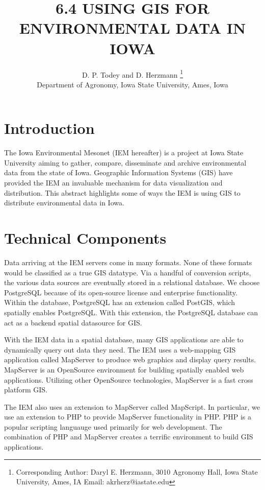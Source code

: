 \documentclass[twocolumn]{article}
\begin{document}
\title{\bf 6.4      USING GIS FOR ENVIRONMENTAL DATA IN IOWA}
\author{D. P. Todey and D. Herzmann \thanks{Corresponding Author:  Daryl E. Herzmann, 3010
Agronomy Hall, Iowa State University, Ames, IA Email: akrherz@iastate.edu}\\
 Department of Agronomy, Iowa State University, Ames, Iowa \\
}

\amstitle

\section{Introduction}

The Iowa Environmental Mesonet (IEM hereafter) is a project at Iowa State 
University aiming to gather, compare, disseminate and archive environmental 
data from the state of Iowa.  Geographic Information Systems (GIS) have
provided the IEM an invaluable mechanism for data visualization 
and distribution.  This abstract highlights some of ways the IEM is using
GIS to distribute environmental data in Iowa.

\section{Technical Components}

Data arriving at the IEM servers come in many formats.  None of these formats
 would be classified as a true GIS datatype.  Via a handful of conversion
scripts, the various data sources are eventually stored in a relational 
database.  We choose PostgreSQL because of its open-source 
license and enterprise functionality.  Within the database, PostgreSQL has 
an extension called PostGIS, which spatially enables PostgreSQL.  With this 
extension, the PostgreSQL database can act as a backend spatial datasource for
GIS.

With the IEM data in a spatial database, many GIS applications are able to 
dynamically query out data they need.  The IEM uses a web-mapping GIS 
application called MapServer to produce web graphics and display query results.
MapServer is an OpenSource environment for building spatially enabled web
applications.  Utilizing other OpenSource technologies, MapServer is a fast 
cross platform GIS.

The IEM also uses an extension to MapServer called MapScript.  In particular, 
we use an extension to PHP to provide MapServer functionality in PHP.  PHP
is a popular scripting languauge used primarily for web development.  The 
combination of PHP and MapServer creates a terrific environment to build GIS
applications.
\end{document}
